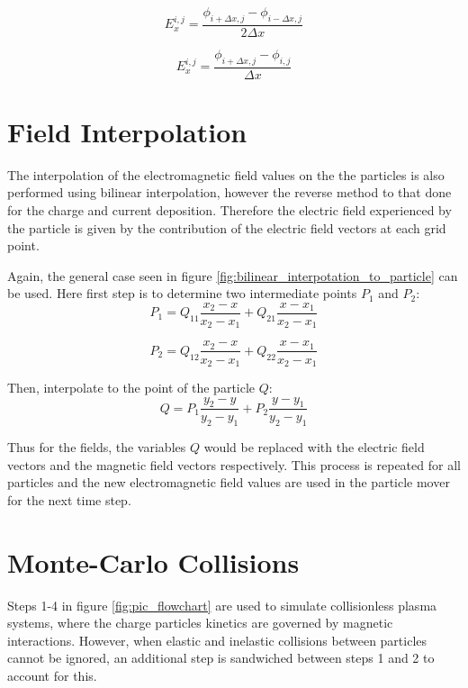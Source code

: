 \begin{equation}
	E_{x}^{i,j} = \frac{\phi_{i + \Delta x, j} - \phi_{i - \Delta x, j}}{2 \Delta x}
	\label{eq:electric_field_equation}
\end{equation}

\begin{equation}
	E_{x}^{i,j} = \frac{\phi_{i + \Delta x, j} - \phi_{i, j}}{\Delta x}
	\label{eq:electric_field_equation_boundary}
\end{equation}


\section{Field Interpolation}

The interpolation of the electromagnetic field values on the the particles is also performed using bilinear interpolation, however the reverse method to that done for the charge and current deposition. Therefore the electric field experienced by the particle is given by the contribution of the electric field vectors at each grid point. 

Again, the general case seen in figure \ref{fig:bilinear_interpotation_to_particle} can be used. Here first step is to determine two intermediate points $P_1$ and $P_2$:
\begin{equation}
	P_1 = Q_{11}\frac{x_2 - x}{x_2 - x_1} + Q_{21}\frac{x - x_1}{x_2 - x_1}
\end{equation}

\begin{equation}
	P_2 = Q_{12}\frac{x_2 - x}{x_2 - x_1} + Q_{22}\frac{x - x_1}{x_2 - x_1}
\end{equation}

Then, interpolate to the point of the particle $Q$:
\begin{equation}
	Q = P_1\frac{y_2 - y}{y_2 - y_1} + P_2\frac{y - y_1}{y_2 - y_1}
\end{equation}

Thus for the fields, the variables $Q$ would be replaced with the electric field vectors and the magnetic field vectors respectively. This process is repeated for all particles and the new electromagnetic field values are used in the particle mover for the next time step.  


\section{Monte-Carlo Collisions}

Steps 1-4 in figure \ref{fig:pic_flowchart} are used to simulate collisionless plasma systems, where the charge particles kinetics are governed by magnetic interactions. However, when  elastic and inelastic collisions between particles cannot be ignored, an additional step is sandwiched between steps 1 and 2 to account for this. 

